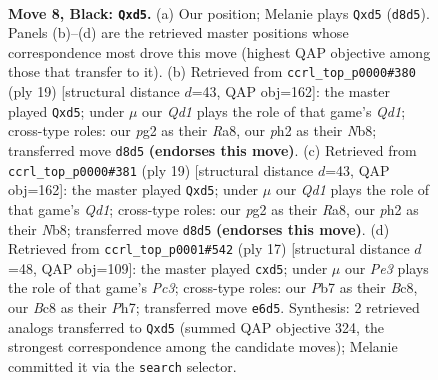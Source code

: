 \documentclass[11pt]{article}
\begin{document}
\begin{figure}[p]\centering
\begin{subfigure}{0.46\textwidth}\centering
\resizebox{\linewidth}{!}{%
\newchessgame
\chessboard[
  setfen={rnbq1rk1/pp3ppp/4pn2/3P4/1b1N4/2NBP3/PP3PPP/R1BQK2R b KQ - 0 8},
  showmover=false,
  pgfstyle=straightmove, color=movearrow, markmove={d8-d5}
]}
\caption{}
\end{subfigure}\hfill
\begin{subfigure}{0.46\textwidth}\centering
\resizebox{\linewidth}{!}{%
\newchessgame
\chessboard[
  setfen={rnbq1rk1/1p3pp1/4pn1p/p2P4/1b1N3B/2N1P3/PPQ2PPP/R3KB1R b KQ - 0 10},
  showmover=false,
  pgfstyle=straightmove, color=movearrow, markmove={d8-d5}
]}
\caption{}
\end{subfigure}
\\[4pt]
\begin{subfigure}{0.46\textwidth}\centering
\resizebox{\linewidth}{!}{%
\newchessgame
\chessboard[
  setfen={rnbq1rk1/1p3pp1/4pn1p/p2P4/1b1N3B/2N1P3/PPQ2PPP/R3KB1R b KQ - 0 10},
  showmover=false,
  pgfstyle=straightmove, color=movearrow, markmove={d8-d5}
]}
\caption{}
\end{subfigure}\hfill
\begin{subfigure}{0.46\textwidth}\centering
\resizebox{\linewidth}{!}{%
\newchessgame
\chessboard[
  setfen={rnbq1rk1/pp2bppp/2p2n2/3P4/2BN1B2/P1N5/1PP2PPP/R2QK2R b KQ - 0 9},
  showmover=false,
  pgfstyle=straightmove, color=movearrow, markmove={c6-d5}
]}
\caption{}
\end{subfigure}
\caption{\textbf{Move 8, Black: \texttt{Qxd5}.} (a) Our position; Melanie plays \texttt{Qxd5} (\texttt{d8d5}). Panels (b)--(d) are the retrieved master positions whose correspondence most drove this move (highest QAP objective among those that transfer to it). (b) Retrieved from \texttt{ccrl\_top\_p0000\#380} (ply 19) [structural distance $d$=43, QAP obj=162]: the master played \texttt{Qxd5}; under $\mu$ our \emph{Qd1} plays the role of that game's \emph{Qd1}; cross-type roles: our \emph{p}g2 as their \emph{R}a8, our \emph{p}h2 as their \emph{N}b8; transferred move \texttt{d8d5} \textbf{(endorses this move)}. (c) Retrieved from \texttt{ccrl\_top\_p0000\#381} (ply 19) [structural distance $d$=43, QAP obj=162]: the master played \texttt{Qxd5}; under $\mu$ our \emph{Qd1} plays the role of that game's \emph{Qd1}; cross-type roles: our \emph{p}g2 as their \emph{R}a8, our \emph{p}h2 as their \emph{N}b8; transferred move \texttt{d8d5} \textbf{(endorses this move)}. (d) Retrieved from \texttt{ccrl\_top\_p0001\#542} (ply 17) [structural distance $d$=48, QAP obj=109]: the master played \texttt{cxd5}; under $\mu$ our \emph{Pe3} plays the role of that game's \emph{Pc3}; cross-type roles: our \emph{P}b7 as their \emph{B}c8, our \emph{B}c8 as their \emph{P}h7; transferred move \texttt{e6d5}. Synthesis: 2 retrieved analogs transferred to \texttt{Qxd5} (summed QAP objective 324, the strongest correspondence among the candidate moves); Melanie committed it via the \texttt{search} selector.}
\label{fig:thought-m15}
\end{figure}
\end{document}
